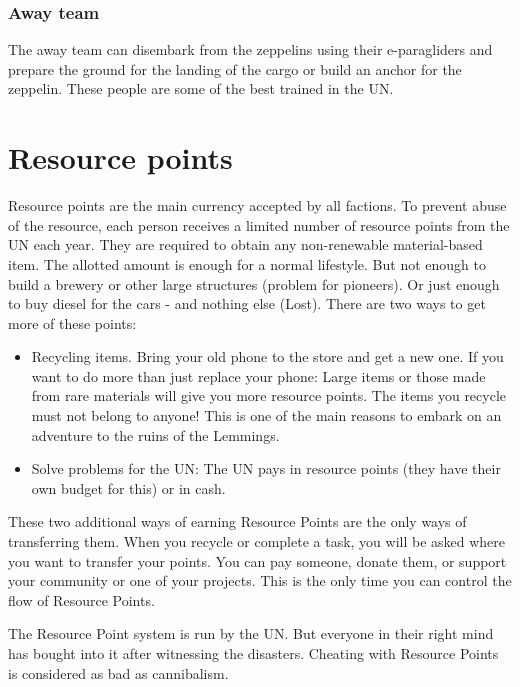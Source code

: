 \subsubsection{Away team}
\label{sec:UN away team}
The away team can disembark from the zeppelins using their e-paragliders and prepare the ground for the landing of the cargo or build an anchor for the zeppelin. These people are some of the best trained in the UN.

\section{Resource points}
\label{sec:Resource Points}
Resource points are the main currency accepted by all factions. To prevent abuse of the resource, each person receives a limited number of resource points from the UN each year. They are required to obtain any non-renewable material-based item. The allotted amount is enough for a normal lifestyle. But not enough to build a brewery or other large structures (problem for pioneers). Or just enough to buy diesel for the cars - and nothing else (Lost). There are two ways to get more of these points:

\begin{itemize}
    \item Recycling items. Bring your old phone to the store and get a new one. If you want to do more than just replace your phone: Large items or those made from rare materials will give you more resource points. The items you recycle must not belong to anyone! This is one of the main reasons to embark on an adventure to the ruins of the Lemmings.
    \item Solve problems for the UN: The UN pays in resource points (they have their own budget for this) or in cash.
\end{itemize}

These two additional ways of earning Resource Points are the only ways of transferring them. When you recycle or complete a task, you will be asked where you want to transfer your points. You can pay someone, donate them, or support your community or one of your projects. This is the only time you can control the flow of Resource Points.

The Resource Point system is run by the UN. But everyone in their right mind has bought into it after witnessing the disasters. Cheating with Resource Points is considered as bad as cannibalism.



